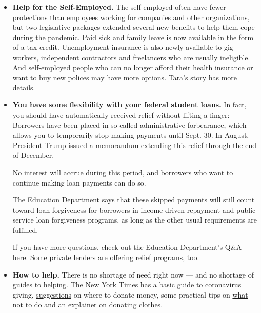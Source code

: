 \begin{itemize}
\item
  \textbf{Help for the Self-Employed.} The self-employed often have
  fewer protections than employees working for companies and other
  organizations, but two legislative packages extended several new
  benefits to help them cope during the pandemic. Paid sick and family
  leave is now available in the form of a tax credit. Unemployment
  insurance is also newly available to gig workers, independent
  contractors and freelancers who are usually ineligible. And
  self-employed people who can no longer afford their health insurance
  or want to buy new polices may have more options.
  \href{https://www.nytimes3xbfgragh.onion/article/self-employed-workers-unemployment-coronavirus-stimulus-package.html}{Tara's
  story} has more details.
\item
  \textbf{You have some flexibility with your federal student loans.} In
  fact, you should have automatically received relief without lifting a
  finger: Borrowers have been placed in so-called administrative
  forbearance, which allows you to temporarily stop making payments
  until Sept. 30. In August, President Trump issued
  \href{https://www.whitehouse.gov/presidential-actions/memorandum-continued-student-loan-payment-relief-covid-19-pandemic/}{a
  memorandum} extending this relief through the end of December.

  No interest will accrue during this period, and borrowers who want to
  continue making loan payments can do so.

  The Education Department says that these skipped payments will still
  count toward loan forgiveness for borrowers in income-driven repayment
  and public service loan forgiveness programs, as long as the other
  usual requirements are fulfilled.

  If you have more questions, check out the Education Department's Q\&A
  \href{https://studentaid.gov/announcements-events/coronavirus\#borrower-questions}{here}.
  Some private lenders are offering relief programs, too.
\item
  \textbf{How to help.} There is no shortage of need right now --- and
  no shortage of guides to helping. The New York Times has a
  \href{https://www.nytimes3xbfgragh.onion/article/coronavirus-how-to-help-donations-charities.html}{basic
  guide} to coronavirus giving,
  \href{https://www.nytimes3xbfgragh.onion/2020/03/27/smarter-living/coronavirus-charity-donations.html}{suggestions}
  on where to donate money, some practical tips on
  \href{https://www.nytimes3xbfgragh.onion/2020/04/10/nyregion/coronavirus-help-healthcare-workers.html}{what
  not to do} and an
  \href{https://www.nytimes3xbfgragh.onion/2020/04/13/style/self-care/donate-clothes-coronavirus.html}{explainer}
  on donating clothes.


\end{itemize}
